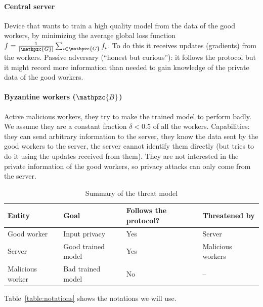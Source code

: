 \documentclass{article}
\newcommand{\gset}{\ensuremath{{\mathpzc{G}}}}
\newcommand{\bset}{\ensuremath{{\mathpzc{B}}}}
\begin{document}
\paragraph*{Central server} Device that wants to train a high quality model from the data of the good workers, by minimizing the average global loss function $f = \tfrac{1}{|\gset|} \tsum_{i\in\gset} f_i$. To do this it receives updates (gradients) from the workers. Passive adversary (``honest but curious''): it follows the protocol but it might record more information than needed to gain knowledge of the private data of the good workers. 

\paragraph*{Byzantine workers ($\bset$)} Active malicious workers, they try to make the trained model to perform badly. We assume they are a constant fraction $\delta < 0.5$ of all the workers.
Capabilities: they can send arbitrary information to the server, they know the data sent by the good workers to the server, the server cannot identify them directly (but tries to do it using the updates received from them). They are not interested in the private information of the good workers, so privacy attacks can only come from the server.


\begin{table}
\caption{Summary of the threat model}\label{table:threat-model}
\centering
\begin{tabular}{llll}
\toprule
Entity & Goal & Follows the protocol? & Threatened by \\
\midrule
Good worker & Input privacy & Yes & Server \\
Server & Good trained model & Yes & Malicious workers \\
Malicious worker & Bad trained model & No & -- \\
\bottomrule
\end{tabular}
\end{table}

Table~\ref{table:notations} shows the notations we will use.



\end{document}
